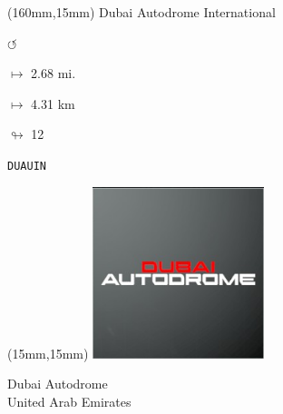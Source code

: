 \begin{textblock*}{40mm}(160mm,15mm)%
Dubai Autodrome International
\par \Huge$\circlearrowleft$
\Large
\par$\mapsto$ 2.68 mi.
\par$\mapsto$ 4.31 km
\par$\looparrowright$ 12
\par\hfill\tiny\tt DUAUIN\\
\end{textblock*}
\null\newpage

\begin{textblock*}{50mm}(15mm,15mm)%
\includegraphics[width=50mm]{LG/2015-05-20_00081.png}
\par Dubai Autodrome\\ United Arab Emirates
\end{textblock*}
